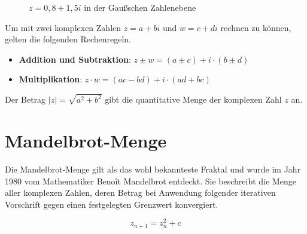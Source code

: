 \begin{figure}[h!]
  \centering
  \caption{$z=0,8 + 1,5i$ in der Gaußschen Zahlenebene}
\end{figure}
\noindent
Um mit zwei komplexen Zahlen $z=a+bi$ und $w=c+di$ rechnen zu können, gelten die folgenden Rechenregeln.
\begin{itemize}
  \item \textbf{Addition und Subtraktion}: $z \pm w = (a \pm c) + i \cdot (b \pm d)$  \cite{Komplexe14:online}
  \item \textbf{Multiplikation}: $z \cdot w = (ac - bd) + i \cdot (ad + bc)$ \cite{Komplexe14:online}
\end{itemize}
Der Betrag $\lvert z \rvert = \sqrt{a^{2}+b^{2}} $ gibt die quantitative Menge der komplexen Zahl $z$ an.\cite{Komplexe61:online}

\pagebreak

\section{Mandelbrot-Menge}
Die Mandelbrot-Menge gilt als das wohl bekannteste Fraktal und wurde im Jahr
1980 vom Mathematiker Benoît Mandelbrot entdeckt. Sie beschreibt die Menge
aller komplexen Zahlen, deren Betrag bei Anwendung folgender iterativen
Vorschrift gegen einen festgelegten Grenzwert konvergiert.

$$z_{n+1} = z_{n}^{2}+ c$$ \cite{Mandelbr34:online}

